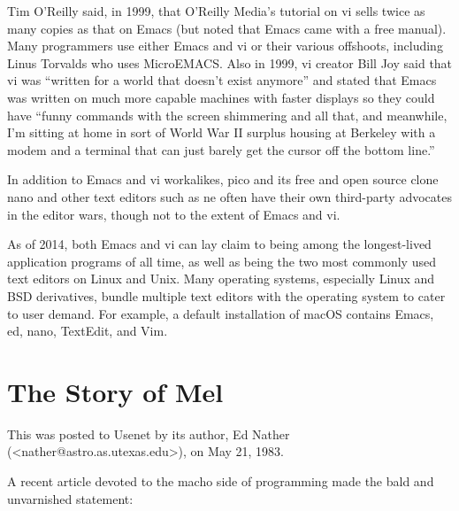\documentclass[10pt,twoside,openright]{memoir}
\begin{document}
Tim O'Reilly said, in 1999, that O'Reilly Media's tutorial on vi sells twice as many copies as that on Emacs (but noted that Emacs came with a free manual). Many programmers use either Emacs and vi or their various offshoots, including Linus Torvalds who uses MicroEMACS. Also in 1999, vi creator Bill Joy said that vi was ``written for a world that doesn't exist anymore'' and stated that Emacs was written on much more capable machines with faster displays so they could have ``funny commands with the screen shimmering and all that, and meanwhile, I'm sitting at home in sort of World War II surplus housing at Berkeley with a modem and a terminal that can just barely get the cursor off the bottom line.''

In addition to Emacs and vi workalikes, pico and its free and open source clone nano and other text editors such as ne often have their own third-party advocates in the editor wars, though not to the extent of Emacs and vi.

As of 2014, both Emacs and vi can lay claim to being among the longest-lived application programs of all time, as well as being the two most commonly used text editors on Linux and Unix. Many operating systems, especially Linux and BSD derivatives, bundle multiple text editors with the operating system to cater to user demand. For example, a default installation of macOS contains Emacs, ed, nano, TextEdit, and Vim.


\chapter{The Story of Mel}

This was posted to Usenet by its author, Ed Nather (<nather@astro.as.utexas.edu>), on May 21, 1983.

\vskip 0.2in

\noindent A recent article devoted to the macho side of programming
made the bald and unvarnished statement:
\end{document}
